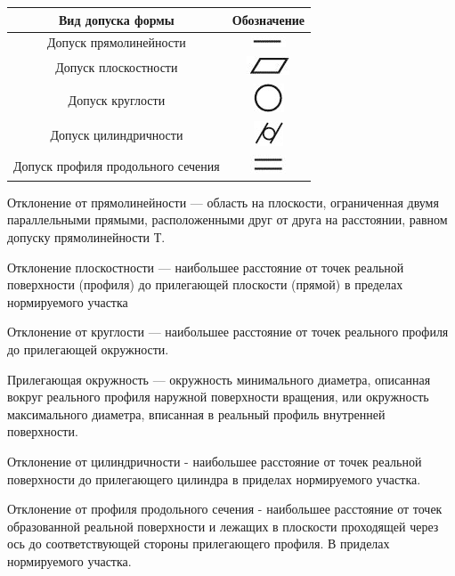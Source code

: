 \begin{tabular}{|c|c|}
	\hline 
	Вид допуска формы & Обозначение \\ 
	\hline 
	Допуск прямолинейности & \includegraphics{pic/dop_form/index.jpg}  \\ 
	\hline 
	Допуск плоскостности & \includegraphics{pic/dop_form/get.jpg}  \\ 
	\hline 
	Допуск круглости & \includegraphics{pic/dop_form/index1.jpg} \\ 
	\hline 
	Допуск цилиндричности & \includegraphics{pic/dop_form/index2.jpg} \\ 
	\hline 
	Допуск профиля продольного сечения & \includegraphics{pic/dop_form/get1.jpg} \\ 
	\hline 
\end{tabular} 

Отклонение от прямолинейности --- область на плоскости, ограниченная двумя параллельными прямыми, расположенными друг от друга на расстоянии, равном допуску прямолинейности Т.

Отклонение плоскостности --- наибольшее расстояние от точек реальной поверхности (профиля) до прилегающей плоскости (прямой) в пределах нормируемого участка

Отклонение от круглости --- наибольшее расстояние от точек реального профиля до прилегающей окружности.

Прилегающая окружность --- окружность минимального диаметра, описанная вокруг реального профиля наружной поверхности вращения, или окружность максимального диаметра, вписанная в реальный профиль внутренней поверхности. 

Отклонение от цилиндричности - наибольшее расстояние от точек реальной поверхности до прилегающего цилиндра в приделах нормируемого участка.

Отклонение от профиля продольного сечения - наибольшее расстояние от точек образованной реальной поверхности и лежащих в плоскости проходящей через ось до соответствующей стороны прилегающего профиля. В приделах нормируемого участка.

